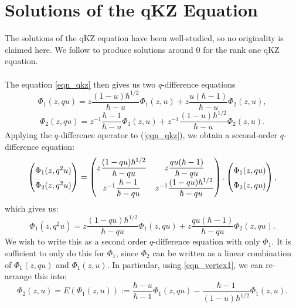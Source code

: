 \documentclass[a4paper]{report}
\theoremstyle{theorem}
\theoremstyle{definition}
\theoremstyle{remark}
\theoremstyle{proposition}
\theoremstyle{conjecture}
\theoremstyle{lemma}
\theoremstyle{corollary}
\theoremstyle{exercise}
\theoremstyle{example}
\begin{document}
  \section{Solutions of the qKZ Equation}
  The solutions of the qKZ equation have been well-studied, so no originality
  is claimed here. We follow \cite[Chapter 11, 12]{efk98} to produce 
  solutions around $0$ for the rank one qKZ equation. \\\\
  The equation \eqref{eqn_qkz} then gives us two $q$-difference equations
  \begin{equation}\label{eqn_vertex1}
      \Phi_1(z,qu) = z\frac{(1-u)\hbar^{1/2}}{\hbar-u} \Phi_1(z,u) + z\frac{u(\hbar-1)}{\hbar-u}\Phi_2(z,u),
  \end{equation}
  \begin{equation}\label{eqn_vertex2}
      \Phi_2(z,qu) = z^{-1}\frac{\hbar-1}{\hbar-u} \Phi_1(z,u) + z^{-1}\frac{(1-u)\hbar^{1/2}}{\hbar - u}\Phi_2(z,u).
  \end{equation}
  Applying the $q$-difference operator to (\ref{eqn_qkz}), we obtain a 
  second-order $q$-difference equation:
  $$
  \begin{pmatrix}
      \Phi_1(z,q^2u)\\
      \Phi_2(z,q^2u)
      \end{pmatrix} = 
      \renewcommand\arraystretch{1.5}\begin{pmatrix}
          z\displaystyle\frac{(1-qu)\hbar^{1/2}}{\hbar - qu} & z\displaystyle\frac{qu(\hbar - 1)}{\hbar - qu}\\
          z^{-1}\displaystyle\frac{\hbar - 1}{\hbar - qu} & z^{-1}\displaystyle\frac{(1-qu)\hbar^{1/2}}{\hbar-qu}
      \end{pmatrix}.
  \begin{pmatrix}
      \Phi_1(z,qu)\\
      \Phi_2(z,qu)
  \end{pmatrix},$$
  which gives us:
  $$\Phi_1(z,q^2u) = z\frac{(1-qu)\hbar^{1/2}}{\hbar - qu} \Phi_1(z,qu) + z \frac{qu(\hbar-1)}{\hbar - qu} \Phi_2(z,qu).$$
  We wish to write this as a second order $q$-difference equation with only 
  $\Phi_1$. It is sufficient to only do this for $\Phi_1$, since $\Phi_2$ 
  can be written as a linear combination of $\Phi_1(z,qu)$ and $\Phi_1(z,u)$.
  In particular, using \eqref{eqn_vertex1}, we can re-arrange this into: 
  \begin{equation}\label{eqn_operator_E}
      \Phi_2(z,u) = E\left(\Phi_1(z,u)\right) := \frac{\hbar-u}{\hbar - 1}\Phi_1(z,qu) - \frac{\hbar-1}{(1-u)\hbar^{1/2}} \Phi_1(z,u).
  \end{equation}
\end{document}
